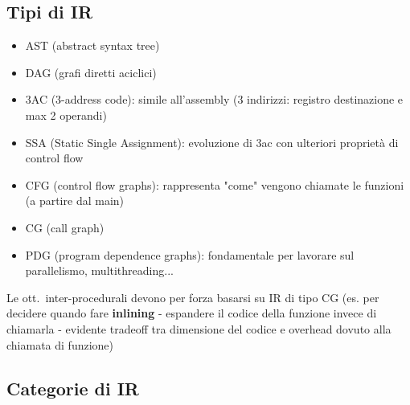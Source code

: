 \vspace{-1em}
\subsection{Tipi di IR}

\begin{itemize}
  \item AST (abstract syntax tree)
  \item DAG (grafi diretti aciclici)
  \item 3AC (3-address code): simile all'assembly (3 indirizzi: registro destinazione e max 2 operandi)
  \item SSA (Static Single Assignment): evoluzione di 3ac con ulteriori propriet\`a di control flow
  \item CFG (control flow graphs): rappresenta "come" vengono chiamate le funzioni (a partire dal main)
  \item CG (call graph)
  \item PDG (program dependence graphs): fondamentale per lavorare sul parallelismo, multithreading...
\end{itemize}

\vspace{-1em}
\begin{emphasize}
  Le ott.~inter-procedurali devono per forza basarsi su IR di tipo CG (es. per decidere quando fare \textbf{inlining} - espandere il codice della funzione invece di chiamarla - evidente tradeoff tra dimensione del codice e overhead dovuto alla chiamata di funzione)
\end{emphasize}

\subsection{Categorie di IR}

